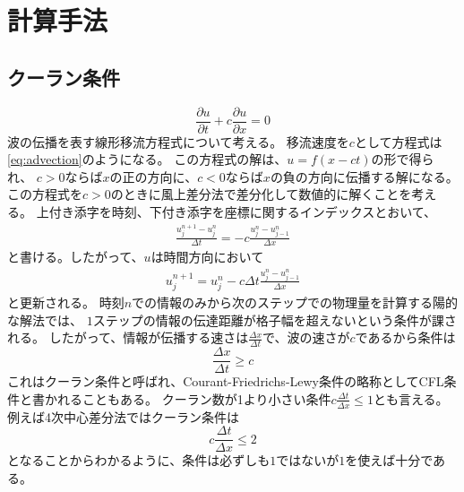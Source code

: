 \documentclass[a4j, dvipdfmx]{jsarticle}
\newcommand{\pder}[2][]{\frac{\partial#1}{\partial#2}}
\begin{document}
\section{計算手法}
\subsection{クーラン条件}
\begin{equation}
    \pder[u]{t} + c\pder[u]{x} = 0\label{eq:advection}
\end{equation}
波の伝播を表す線形移流方程式について考える。
移流速度を$c$として方程式は\eqref{eq:advection}のようになる。
この方程式の解は、$u = f(x -ct)$の形で得られ、
$c>0$ならば$x$の正の方向に、$c<0$ならば$x$の負の方向に伝播する解になる。
この方程式を$c>0$のときに風上差分法で差分化して数値的に解くことを考える。
上付き添字を時刻、下付き添字を座標に関するインデックスとおいて、
\begin{align}
    \frac{u^{n+1}_j - u^{n}_j}{\Delta t} = -c \frac{u^n_{j} - u^n_{j-1}}{\Delta x}
\end{align}
と書ける。したがって、$u$は時間方向において
\begin{align}
    u^{n+1}_j  =  u^{n}_j- c \Delta t\frac{u^n_{j} - u^n_{j-1}}{\Delta x}
\end{align}
と更新される。
時刻$n$での情報のみから次のステップでの物理量を計算する陽的な解法では、
$1$ステップの情報の伝達距離が格子幅を超えないという条件が課される。%
したがって、情報が伝播する速さは$\frac{\Delta x}{\Delta t}$で、波の速さが$c$であるから条件は
\begin{equation}
    \frac{\Delta x}{\Delta t} \geq c
\end{equation}
これはクーラン条件と呼ばれ、Courant-Friedrichs-Lewy条件の略称としてCFL条件と書かれることもある。
クーラン数が1より小さい条件$c\frac{\Delta t}{\Delta x} \leq 1$とも言える。
例えば4次中心差分法ではクーラン条件は
\begin{equation}
  c\frac{\Delta t}{\Delta x} \leq 2
\end{equation}
となることからわかるように、条件は必ずしも$1$ではないが$1$を使えば十分である。
\end{document}

